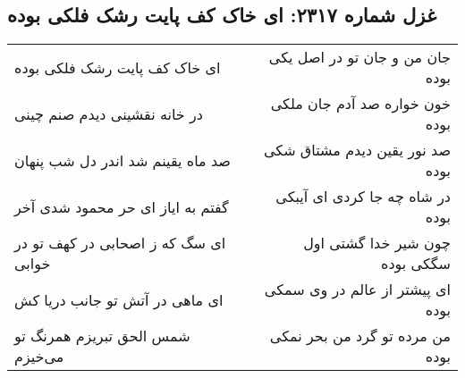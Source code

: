 \begin{center}
\section*{غزل شماره ۲۳۱۷: ای خاک کف پایت رشک فلکی بوده}
\label{sec:2317}
\begin{longtable}{l p{0.5cm} r}
ای خاک کف پایت رشک فلکی بوده
&&
جان من و جان تو در اصل یکی بوده
\\
در خانه نقشینی دیدم صنم چینی
&&
خون خواره صد آدم جان ملکی بوده
\\
صد ماه یقینم شد اندر دل شب پنهان
&&
صد نور یقین دیدم مشتاق شکی بوده
\\
گفتم به ایاز ای حر محمود شدی آخر
&&
در شاه چه جا کردی ای آیبکی بوده
\\
ای سگ که ز اصحابی در کهف تو در خوابی
&&
چون شیر خدا گشتی اول سگکی بوده
\\
ای ماهی در آتش تو جانب دریا کش
&&
ای پیشتر از عالم در وی سمکی بوده
\\
شمس الحق تبریزم همرنگ تو می‌خیزم
&&
من مرده تو گرد من بحر نمکی بوده
\\
\end{longtable}
\end{center}
